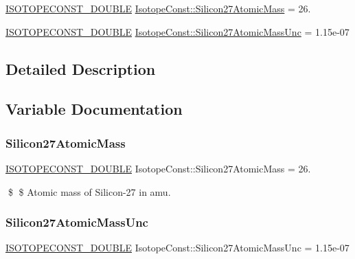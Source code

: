 \begin{DoxyCompactItemize}
\item 
\mbox{\hyperlink{group___isotope_const-_macros_ga8f45a7272ce02c0b4c65c44636ed719a}{I\+S\+O\+T\+O\+P\+E\+C\+O\+N\+S\+T\+\_\+\+D\+O\+U\+B\+LE}} \mbox{\hyperlink{group___isotope_const-_silicon-_si27_ga26e3a0f696e3703e7c89c24fd7dbb464}{Isotope\+Const\+::\+Silicon27\+Atomic\+Mass}} = 26.
\item 
\mbox{\hyperlink{group___isotope_const-_macros_ga8f45a7272ce02c0b4c65c44636ed719a}{I\+S\+O\+T\+O\+P\+E\+C\+O\+N\+S\+T\+\_\+\+D\+O\+U\+B\+LE}} \mbox{\hyperlink{group___isotope_const-_silicon-_si27_gaeb51c45c70f5c95042334b5b2f753a45}{Isotope\+Const\+::\+Silicon27\+Atomic\+Mass\+Unc}} = 1.\+15e-\/07
\end{DoxyCompactItemize}


\subsection{Detailed Description}


\subsection{Variable Documentation}
\mbox{\label{group___isotope_const-_silicon-_si27_ga26e3a0f696e3703e7c89c24fd7dbb464}} 
\subsubsection{\texorpdfstring{Silicon27\+Atomic\+Mass}{Silicon27AtomicMass}}
{\footnotesize\ttfamily \mbox{\hyperlink{group___isotope_const-_macros_ga8f45a7272ce02c0b4c65c44636ed719a}{I\+S\+O\+T\+O\+P\+E\+C\+O\+N\+S\+T\+\_\+\+D\+O\+U\+B\+LE}} Isotope\+Const\+::\+Silicon27\+Atomic\+Mass = 26.}

\$ \$ Atomic mass of Silicon-\/27 in amu. \mbox{\label{group___isotope_const-_silicon-_si27_gaeb51c45c70f5c95042334b5b2f753a45}} 
\subsubsection{\texorpdfstring{Silicon27\+Atomic\+Mass\+Unc}{Silicon27AtomicMassUnc}}
{\footnotesize\ttfamily \mbox{\hyperlink{group___isotope_const-_macros_ga8f45a7272ce02c0b4c65c44636ed719a}{I\+S\+O\+T\+O\+P\+E\+C\+O\+N\+S\+T\+\_\+\+D\+O\+U\+B\+LE}} Isotope\+Const\+::\+Silicon27\+Atomic\+Mass\+Unc = 1.\+15e-\/07}

